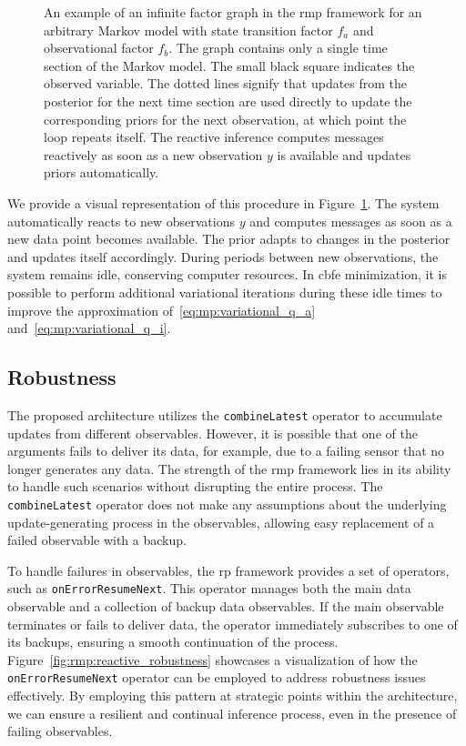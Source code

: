 \begin{figure}
  \centering
  \resizebox{0.85\textwidth}{!}{}
  \caption{
    An example of an infinite factor graph in the \ac{rmp} framework for an arbitrary Markov model with state transition factor $f_a$ and observational factor $f_b$.
    The graph contains only a single time section of the Markov model.
    The small black square indicates the observed variable.
    The dotted lines signify that updates from the posterior for the next time section are used
    directly to update the corresponding priors for the next observation, at which point the loop
    repeats itself.
    The reactive inference computes messages reactively as soon as a new observation $y$ is
    available and updates priors automatically.
  }
  \label{fig:rmp:reactive_inference}
\end{figure}

We provide a visual representation of this procedure in
Figure~\ref{fig:rmp:reactive_inference}.
The system automatically reacts to new observations $y$ and computes messages as soon as a new
data point becomes available.
The prior adapts to changes in the posterior and updates itself accordingly.
During periods between new observations, the system remains idle, conserving computer
resources.
In \ac{cbfe} minimization, it is possible to perform additional variational iterations
during these idle times to improve the approximation of~\eqref{eq:mp:variational_q_a}
and~\eqref{eq:mp:variational_q_i}.

\subsection{Robustness}

The proposed architecture utilizes the \texttt{combineLatest} operator to accumulate updates
from different observables.
However, it is possible that one of the arguments fails to deliver its data, for example, due
to a failing sensor that no longer generates any data.
The strength of the \ac{rmp} framework lies in its ability to handle such scenarios without
disrupting the entire process.
The \texttt{combineLatest} operator does not make any assumptions about the underlying
update-generating process in the observables, allowing easy replacement of a failed observable
with a backup.

To handle failures in observables, the \ac{rp} framework provides a set of operators,
such as \texttt{onErrorResumeNext}.
This operator manages both the main data observable and a collection of backup data
observables.
If the main observable terminates or fails to deliver data, the operator immediately
subscribes to one of its backups, ensuring a smooth continuation of the process.
Figure~\ref{fig:rmp:reactive_robustness} showcases a visualization of how the
\texttt{onErrorResumeNext} operator can be employed to address robustness issues effectively.
By employing this pattern at strategic points within the architecture, we can ensure a
resilient and continual inference process, even in the presence of failing observables.


